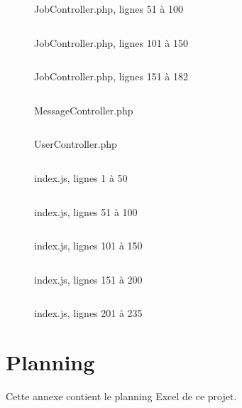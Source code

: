 \documentclass[
    iai, %
    eai, %
]{heig-tb}
\begin{document}
\newpage
\begin{figure}[h]
  \inputminted[breaklines, linenos , firstline=51, lastline=100]{javascript}{assets/code/JobController.php}
  \caption{JobController.php, lignes 51 à 100}
\end{figure}
\newpage
\begin{figure}[h]
  \inputminted[breaklines, linenos , firstline=101, lastline=150]{javascript}{assets/code/JobController.php}
  \caption{JobController.php, lignes 101 à 150}
\end{figure}
\newpage
\begin{figure}[h]
  \inputminted[breaklines, linenos , firstline=151]{javascript}{assets/code/JobController.php}
  \caption{JobController.php, lignes 151 à 182}
\end{figure}
\newpage
\begin{figure}[h]
  \inputminted[breaklines]{javascript}{assets/code/MessageController.php}
  \caption{MessageController.php}
\end{figure}
\newpage
\begin{figure}[h]
  \inputminted[breaklines]{javascript}{assets/code/UserController.php}
  \caption{UserController.php}
\end{figure}
\newpage
\begin{figure}[h]
  \inputminted[breaklines, linenos, firstline=1, lastline=50]{javascript}{assets/code/index.js}
  \caption{index.js, lignes 1 à 50}
\end{figure}
\newpage
\begin{figure}[h]
  \inputminted[breaklines, linenos, firstline=51, lastline=100]{javascript}{assets/code/index.js}
  \caption{index.js, lignes 51 à 100}
\end{figure}
\newpage
\begin{figure}[h]
  \inputminted[breaklines, linenos, firstline=101, lastline=150]{javascript}{assets/code/index.js}
  \caption{index.js, lignes 101 à 150}
\end{figure}
\newpage
\begin{figure}[h]
  \inputminted[breaklines, linenos, firstline=151, lastline=200]{javascript}{assets/code/index.js}
  \caption{index.js, lignes 151 à 200}
\end{figure}
\newpage
\begin{figure}[h]
  \inputminted[breaklines, linenos, firstline=201]{javascript}{assets/code/index.js}
  \caption{index.js, lignes 201 à 235}
\end{figure}

\newpage
\chapter{Planning}
Cette annexe contient le planning Excel de ce projet.
\end{document}
